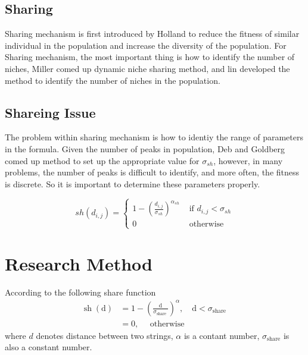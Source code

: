 \documentclass[smallextended]{svjour3}       %
\begin{document}
\begin{multicols}{2}
\begin{center}
\label{plot:GA}
\end{center}

\subsection{Sharing}
Sharing mechanism is first introduced by Holland \cite{miller1996genetic} to reduce the fitness of 
similar individual in the population and increase the diversity of the population. For Sharing mechanism,
the most important thing is how to identify the number of niches, Miller comed up dynamic niche sharing
method, and lin developed the method to identify the number of niches in the population.\cite{lin2002niche}

\subsection{Shareing Issue}
The problem within sharing mechanism is how to identiy the range of parameters in the formula. Given 
the number of peaks in population, Deb and Goldberg comed up method to set up the appropriate value for 
$\sigma_{sh}$, however, in many problems, the number of peaks is difficult to identify, and more often,
the fitness is discrete. So it is important to determine these parameters properly.

\begin{equation}
s h\left(d_{i, j}\right)=\left\{\begin{array}{ll}{1-\left(\frac{d_{i, j}}{\sigma_{s h}}\right)^{\alpha_{s h}}} 
    & {\text { if } d_{i, j}<\sigma_{s h}} \\ 
{0} & {\text { otherwise }}\end{array}\right.
\end{equation}

\section{Research Method}
According to the following share function
\begin{equation}
\begin{aligned} 
\operatorname{sh}(\mathrm{d}) & = 1 - \left(\frac{\mathrm{d}}{\sigma_{\text {share }}}\right)^{\alpha}, 
                                  \quad \mathrm{d}<\sigma_{\text {share }} \\ 
                              & = 0, \quad \text { otherwise }
\end{aligned}
\end{equation}
where $d$ denotes distance between two strings, $\alpha$ is a contant number, $\sigma_{\text {share}}$ 
is also a constant number.


\end{multicols}
\end{document}
